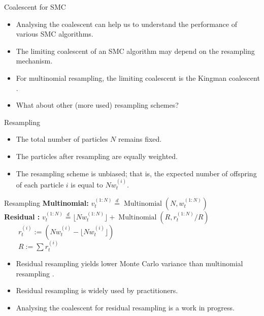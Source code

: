 \documentclass[aspectratio=169]{beamer}
\theoremstyle{definition}
\newcommand{\eqdist}{\overset{d}{=}}
\newcommand{\vt}[2][t]{v_{#1}^{(#2)}}
\newcommand{\wt}[2][t]{w_{#1}^{(#2)}}
\begin{document}
\begin{frame}{Coalescent for SMC}
\begin{itemize}
\item Analysing the coalescent can help us to understand the performance of various SMC algorithms.
\item The limiting coalescent of an SMC algorithm may depend on the resampling mechanism.
\item For multinomial resampling, the limiting coalescent is the Kingman coalescent \cite{koskela2018}.
\item What about other (more used) resampling schemes?
\end{itemize}
\end{frame}

\begin{frame}{Resampling}
\begin{itemize}
\item The total number of particles $N$ remains fixed. 
\item The particles after resampling are equally weighted. 
\item The resampling scheme is unbiased; that is, the expected number of offspring of each particle $i$ is equal to $N\wt{i}$.
\end{itemize}
\end{frame}

\begin{frame}{Resampling}
\textbf{Multinomial:}
$\vt{1:N} \eqdist \operatorname{Multinomial}(N, \wt{1:N})$\\[12pt]
\pause
\textbf{Residual \cite{liu1998}:}
$\vt{1:N} \eqdist \lfloor N \wt{1:N} \rfloor +  \operatorname{Multinomial}(R, r_t^{(1:N)}/R)$\\[7pt]
$\qquad r_t^{(i)} := (N \wt{i} - \lfloor N \wt{i}\rfloor)$\\[7pt]
$\qquad R:= \sum r_t^{(i)}$\\[12pt]
\pause
\begin{itemize}
\item Residual resampling yields lower Monte Carlo variance than multinomial resampling \cite{douc2005}.
\item Residual resampling is widely used by practitioners.
\item Analysing the coalescent for residual resampling is a work in progress.
\end{itemize}
\end{frame}
\end{document}
